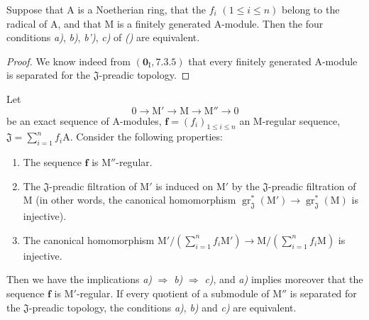 \begin{corollary}[19.5.2]
\label{IV.19.5.2}
Suppose that $\mathrm{A}$ is a Noetherian ring, that the $f_i$ $(1\leqslant i\leqslant n)$ belong to the radical of $\mathrm{A}$, and that $\mathrm{M}$ is a finitely generated $\mathrm{A}$-module. Then the four conditions \emph{a)}, \emph{b)}, \emph{b')}, \emph{c)} of \emph{()} are equivalent.
\end{corollary}

\begin{proof}
We know indeed from $(\mathbf{0}_\mathrm{I},7.3.5)$ that every finitely generated $\mathrm{A}$-module is separated for the $\mathfrak{J}$-preadic topology.
\end{proof}

\begin{proposition}[19.5.3]
\label{IV.19.5.3}
Let
\[
  0\to\mathrm{M}'\to\mathrm{M}\to\mathrm{M}''\to 0
\]
be an exact sequence of $\mathrm{A}$-modules, $\mathbf{f}=(f_i)_{1\leqslant i\leqslant n}$ an M-regular sequence, $\mathfrak{J}=\sum_{i=1}^{n}f_i\mathrm{A}$. Consider the following properties:
\begin{enumerate}
\item[\rm a)] The sequence $\mathbf{f}$ is $\mathrm{M}''$-regular.
\item[\rm b)] The $\mathfrak{J}$-preadic filtration of $\mathrm{M}'$ is induced on $\mathrm{M}'$ by the $\mathfrak{J}$-preadic filtration of $\mathrm{M}$ (in other words, the canonical homomorphism $\operatorname{gr}_\mathfrak{J}^*(\mathrm{M}')\to\operatorname{gr}_\mathfrak{J}^*(\mathrm{M})$ is injective).
\item[\rm c)] The canonical homomorphism $\mathrm{M}'/(\sum_{i=1}^{n}f_i\mathrm{M}')\to\mathrm{M}/(\sum_{i=1}^{n}f_i\mathrm{M})$ is injective.
\end{enumerate}
Then we have the implications \emph{a)} $\Rightarrow$ \emph{b)} $\Rightarrow$ \emph{c)}, and \emph{a)} implies moreover that the sequence $\mathbf{f}$ is $\mathrm{M}'$-regular.
If every quotient of a submodule of $\mathrm{M}''$ is separated for the $\mathfrak{J}$-preadic topology, the conditions \emph{a)}, \emph{b)} and \emph{c)} are equivalent.
\end{proposition}

